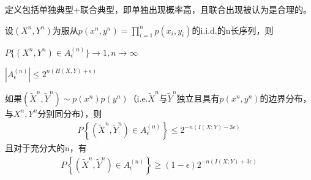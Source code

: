 \documentclass{ctexbook}
\begin{document}
定义包括单独典型+联合典型，即单独出现概率高，且联合出现被认为是合理的。

\begin{theorem}[联合AEP]
    设$(X^n,Y^n)$为服从$p(x^n,y^n)=\prod_{i=1}^n p(x_i,y_i)$的i.i.d.的n长序列，则

    $P\{(X^n,Y^n)\in A^{(n)}_{\epsilon}\}\to 1,n\to\infty$

    $|A^{(n)}_{\epsilon}|\leq 2^{n(H(X,Y)+\epsilon)}$

    如果$(\tilde{X}^n,\tilde{Y}^n)\sim p(x^n)p(y^n)$（i.e.$\tilde{X}^n$与$\tilde{Y}^n$独立且具有$p(x^n,y^n)$的边界分布，与$X^n,Y^n$分别同分布），则
    \begin{align*}
        P\left\{\left(\tilde{X}^n,\tilde{Y}^n\right)\in A^{(n)}_{\epsilon}\right\}\leq 2^{-n(I(X;Y)-3\epsilon)}
    \end{align*}
    且对于充分大的n，有\begin{align*}
        P\left\{\left(\tilde{X}^n,\tilde{Y}^n\right)\in A^{(n)}_{\epsilon}\right\}\geq (1-\epsilon)2^{-n(I(X;Y)+3\epsilon)}
    \end{align*}
\end{theorem}
\end{document}

